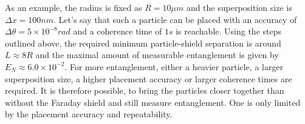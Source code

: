 As an example, the radius is fixed as $R=10\si{\mu m}$ and the superposition size is $\Delta x = 100\si{nm}$. Let's say that such a particle can be placed with an accuracy of $\Delta \theta = 5 \times 10^{-8} \si{rad}$ and a coherence time of $1\si{s}$ is reachable. 
Using the steps outlined above, the required minimum particle-shield separation is around $L\approx 8R$ and the maximal amount of measurable entanglement is given by $E_N \approx 6.0\times 10^{-2}$.
For more entanglement, either a heavier particle, a larger superposition size, a higher placement accuracy or larger coherence times are required. 
It is therefore possible, to bring the particles closer together than without the Faraday shield and still measure entanglement.
One is only limited by the placement accuracy and repeatability.